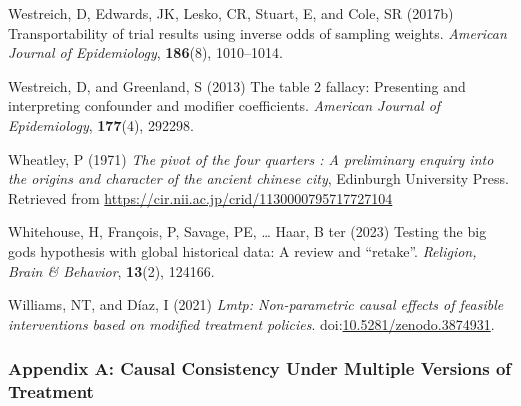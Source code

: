\documentclass[
  singlecolumn]{article}
\newlength{\cslhangindent}
\newenvironment{CSLReferences}[2] %
 {\begin{list}{}{%
  \setlength{\itemindent}{0pt}
  \setlength{\leftmargin}{0pt}
  \setlength{\parsep}{0pt}
  \ifodd #1
   \setlength{\leftmargin}{\cslhangindent}
   \setlength{\itemindent}{-1\cslhangindent}
  \fi
  \setlength{\itemsep}{#2\baselineskip}}}
 {\end{list}}
\begin{document}
\begin{CSLReferences}{1}{0}
Westreich, D, Edwards, JK, Lesko, CR, Stuart, E, and Cole, SR (2017b)
Transportability of trial results using inverse odds of sampling
weights. \emph{American Journal of Epidemiology}, \textbf{186}(8),
1010--1014.

Westreich, D, and Greenland, S (2013) The table 2 fallacy: Presenting
and interpreting confounder and modifier coefficients. \emph{American
Journal of Epidemiology}, \textbf{177}(4), 292298.

Wheatley, P (1971) \emph{The pivot of the four quarters : A preliminary
enquiry into the origins and character of the ancient chinese city},
Edinburgh University Press. Retrieved from
\url{https://cir.nii.ac.jp/crid/1130000795717727104}

Whitehouse, H, François, P, Savage, PE, \ldots{} Haar, B ter (2023)
Testing the big gods hypothesis with global historical data: A review
and {``}retake{''}. \emph{Religion, Brain \& Behavior}, \textbf{13}(2),
124166.

Williams, NT, and Díaz, I (2021) \emph{Lmtp: Non-parametric causal
effects of feasible interventions based on modified treatment policies}.
doi:\href{https://doi.org/10.5281/zenodo.3874931}{10.5281/zenodo.3874931}.

\end{CSLReferences}

\newpage{}

\subsubsection{Appendix A: Causal Consistency Under Multiple Versions of
Treatment}\label{appendix-a-causal-consistency-under-multiple-versions-of-treatment}
\end{document}
